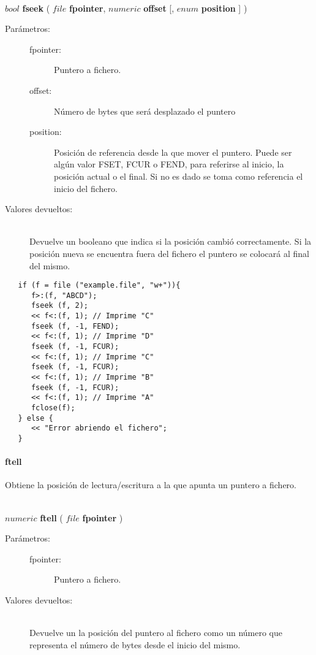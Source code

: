 \begin{framed}
\hfill \\ $bool$ \textbf{fseek} ( $file$ \textbf{fpointer}, $numeric$ \textbf{offset} [, $enum$ \textbf{position} ]  )  
\begin{description}
\item [Parámetros:] \hfill 
   \begin{description}
   \item[fpointer:] Puntero a fichero. 
   \item[offset:] Número de bytes que será desplazado el puntero
   \item[position:] Posición de referencia desde la que mover el puntero. Puede ser algún valor 
   FSET, FCUR o FEND, para referirse al inicio, la posición actual o el final. Si no es dado se
   toma como referencia el inicio del fichero.
   \end{description}
\item[Valores devueltos:] \hfill \\
   Devuelve un booleano que indica si la posición cambió correctamente. Si la posición 
   nueva se encuentra fuera del fichero el puntero se colocará al final del mismo.
\end{description}
\end{framed}

\begin{lstlisting}  
   if (f = file ("example.file", "w+")){
      f>:(f, "ABCD");
      fseek (f, 2);
      << f<:(f, 1); // Imprime "C"
      fseek (f, -1, FEND);
      << f<:(f, 1); // Imprime "D"
      fseek (f, -1, FCUR);
      << f<:(f, 1); // Imprime "C"
      fseek (f, -1, FCUR);
      << f<:(f, 1); // Imprime "B"
      fseek (f, -1, FCUR);
      << f<:(f, 1); // Imprime "A"
      fclose(f);
   } else {
      << "Error abriendo el fichero";
   }
\end{lstlisting}

\paragraph{ftell}
Obtiene la posición de lectura/escritura a la que apunta un puntero a fichero.

\begin{framed}
\hfill \\ $numeric$ \textbf{ftell} ( $file$ \textbf{fpointer}  )  
\begin{description}
\item [Parámetros:] \hfill 
   \begin{description}
   \item[fpointer:] Puntero a fichero. 
   \end{description}
\item[Valores devueltos:] \hfill \\
   Devuelve un la posición del puntero al fichero como un número que representa el
   número de bytes desde el inicio del mismo. 
\end{description}
\end{framed}

